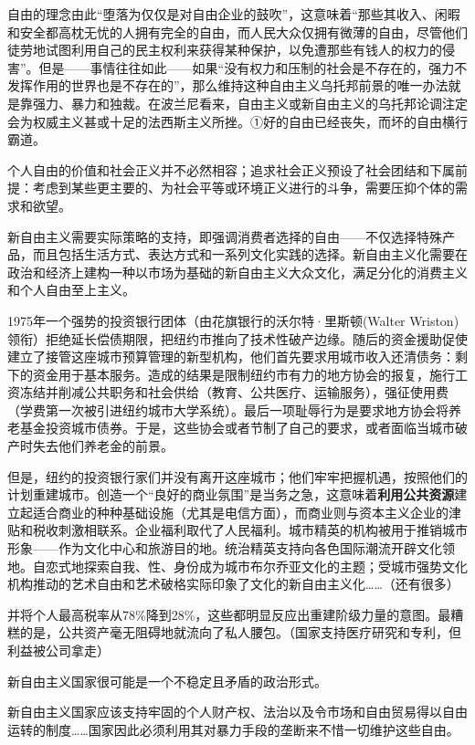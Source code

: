 自由的理念由此“堕落为仅仅是对自由企业的鼓吹”，这意味着“那些其收入、闲暇和安全都高枕无忧的人拥有完全的自由，而人民大众仅拥有微薄的自由，尽管他们徒劳地试图利用自己的民主权利来获得某种保护，以免遭那些有钱人的权力的侵害”。但是——事情往往如此——如果“没有权力和压制的社会是不存在的，强力不发挥作用的世界也是不存在的”，那么维持这种自由主义乌托邦前景的唯一办法就是靠强力、暴力和独裁。在波兰尼看来，自由主义或新自由主义的乌托邦论调注定会为权威主义甚或十足的法西斯主义所挫。①好的自由已经丧失，而坏的自由横行霸道。

个人自由的价值和社会正义并不必然相容；追求社会正义预设了社会团结和下属前提：考虑到某些更主要的、为社会平等或环境正义进行的斗争，需要压抑个体的需求和欲望。

新自由主义需要实际策略的支持，即强调消费者选择的自由——不仅选择特殊产品，而且包括生活方式、表达方式和一系列文化实践的选择。新自由主义化需要在政治和经济上建构一种以市场为基础的新自由主义大众文化，满足分化的消费主义和个人自由至上主义。

1975年一个强势的投资银行团体（由花旗银行的沃尔特·里斯顿(Walter Wriston)领衔）拒绝延长偿债期限，把纽约市推向了技术性破产边缘。随后的资金援助促使建立了接管这座城市预算管理的新型机构，他们首先要求用城市收入还清债务：剩下的资金用于基本服务。造成的结果是限制纽约市有力的地方协会的报复，施行工资冻结并削减公共职务和社会供给（教育、公共医疗、运输服务），强征使用费（学费第一次被引进纽约城市大学系统）。最后一项耻辱行为是要求地方协会将养老基金投资城市债券。于是，这些协会或者节制了自己的要求，或者面临当城市破产时失去他们养老金的前景。

但是，纽约的投资银行家们并没有离开这座城市；他们牢牢把握机遇，按照他们的计划重建城市。创造一个“良好的商业氛围”是当务之急，这意味着\textbf{利用公共资源}建立起适合商业的种种基础设施（尤其是电信方面），而商业则与资本主义企业的津贴和税收刺激相联系。企业福利取代了人民福利。城市精英的机构被用于推销城市形象——作为文化中心和旅游目的地。统治精英支持向各色国际潮流开辟文化领地。自恋式地探索自我、性、身份成为城市布尔乔亚文化的主题；受城市强势文化机构推动的艺术自由和艺术破格实际印象了文化的新自由主义化……（还有很多）

并将个人最高税率从78\%降到28\%，这些都明显反应出重建阶级力量的意图。最糟糕的是，公共资产毫无阻碍地就流向了私人腰包。（国家支持医疗研究和专利，但利益被公司拿走）

新自由主义国家很可能是一个不稳定且矛盾的政治形式。

新自由主义国家应该支持牢固的个人财产权、法治以及令市场和自由贸易得以自由运转的制度……国家因此必须利用其对暴力手段的垄断来不惜一切维护这些自由。


